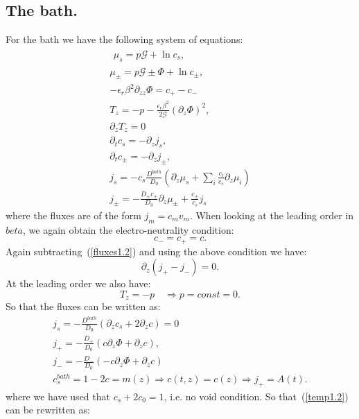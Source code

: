 \documentclass[12pt]{extarticle}
\begin{document}
\subsection{The bath.}
For the bath we have the following system of equations:
\begin{gather}
\begin{aligned}
\mu_s = p \mathcal{G} + \ln c_s, 
\end{aligned}\\[2.5mm]
\mu_\pm = p \mathcal{G} \pm \Phi + \ln c_\pm ,\\
-\epsilon_r\beta^2\partial_{zz} \Phi = c_+-c_-\, \\
T_z= -p-\frac{\epsilon_r\beta^2 }{2\mathcal{G}} (\partial_z \Phi)^2,\\
\partial_z T_z=0\\
\partial_t c_s = - \partial_z j_s,\\
\partial_t c_\pm = -\partial_z j_\pm,\label{fluxes1.2}\\
j_s =-c_s \frac{D^{bath}}{D_0}  \left(\partial_z\mu_s +\sum_i \frac{c_i}{c_s} \partial_z \mu_i\right)\\
j_\pm= - \frac{D_\pm c_\pm}{D_0}\partial_z \mu_\pm +  \frac{c_\pm}{c_s}j_s
\end{gather}
where the fluxes are of the form $j_m=c_m v_m$.
When looking at the leading order in $beta$, we again obtain the electro-neutrality condition:
\begin{equation}
c_-=c_+=c.
\end{equation}
Again subtracting~(\ref{fluxes1.2}) and using the above condition we have:
\begin{equation}
\partial_z(j_+-j_-)=0.\label{temp1.2}
\end{equation}
At the leading order we also have:
\begin{equation}
T_z =-p \quad \Rightarrow p=const=0.
\end{equation}
So that the fluxes can be written as:
\begin{gather}
j_s =-\frac{D^{bath}}{D_0}  \left(\partial_zc_s + 2 \partial_z c\right)=0\\
j_+= - \frac{D_+}{D_0}\left(c\partial_z\Phi + \partial_z c\right),\\
j_-= - \frac{D_-}{D_0}\left(-c\partial_z\Phi + \partial_z c\right)\\
c_s^{bath}=1-2c=m(z) \Rightarrow c(t,z)=c(z) \Rightarrow j_+ = A(t).
\end{gather}
where we have used that $c_s+2c_0=1$, i.e. no void condition.
So that~(\ref{temp1.2}) can be rewritten as:
\end{document}
